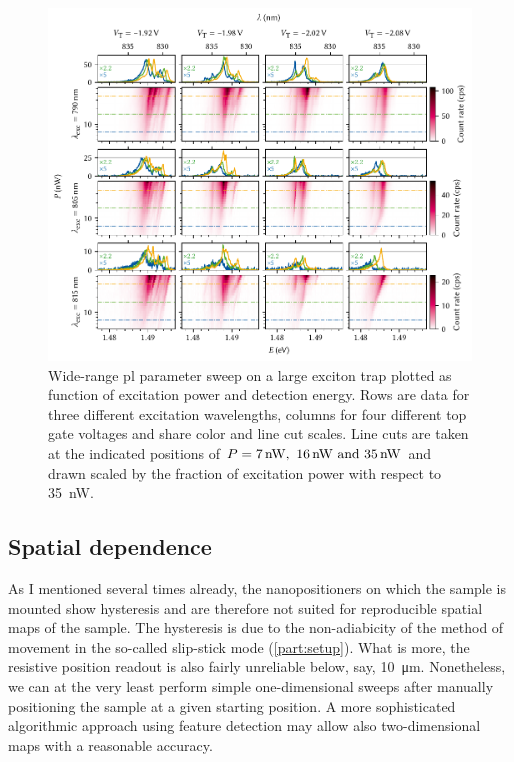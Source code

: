 \begin{figure}
    \centering
    \includegraphics{img/pdf/experiment/doped_M1_05_49-2_multiplets}
    \caption[
        .
        \protect\newline
    ]{
        Wide-range \gls{pl} parameter sweep on a large exciton trap plotted as function of excitation power and detection energy.
        Rows are data for three different excitation wavelengths, columns for four different top gate voltages \VT and share color and line cut scales.
        Line cuts are taken at the indicated positions of $P = \qtylist{7;16;35}{\nano\watt}$ and drawn scaled by the fraction of excitation power with respect to \qty{35}{\nano\watt}.
    }
    \label{fig:exp:pl:doped_M1_05_49-2_multiplets}
\end{figure}

\subsection{Spatial dependence}\label{subsec:exp:observations:pl:spatial}
As I mentioned several times already, the nanopositioners on which the sample is mounted show hysteresis and are therefore not suited for reproducible spatial maps of the sample.
The hysteresis is due to the non-adiabicity of the method of movement in the so-called slip-stick mode (\cf \cref{part:setup}).
What is more, the resistive position readout is also fairly unreliable below, say, \qty{10}{\micro\meter}.
Nonetheless, we can at the very least perform simple one-dimensional sweeps after manually positioning the sample at a given starting position.
A more sophisticated algorithmic approach using feature detection may allow also two-dimensional maps with a reasonable accuracy.

